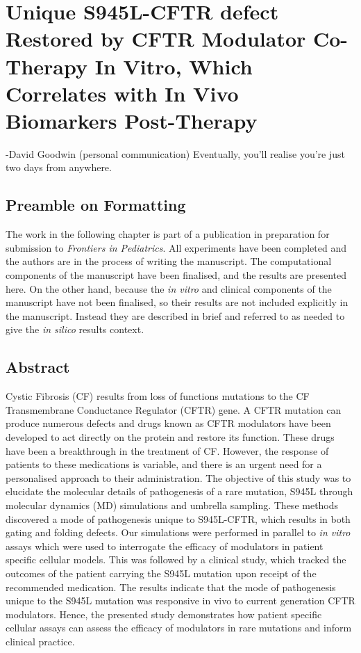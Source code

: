\chapter{Unique S945L-CFTR defect Restored by CFTR Modulator Co-Therapy In Vitro, Which Correlates with In Vivo Biomarkers Post-Therapy}
\label{chap:S945L}

\setcounter{figure}{0}
\renewcommand{\thefigure}{\arabic{chapter}.\arabic{figure}}

\begin{chapquote}{-David Goodwin (personal communication)}
Eventually, you'll realise you're just two days from anywhere.
\end{chapquote}


\section*{\centering Preamble on Formatting} 
The work in the following chapter is part of a publication in preparation for submission to \textit{Frontiers in Pediatrics}. All experiments have been completed and the authors are in the process of writing the manuscript. The computational components of the manuscript have been finalised, and the results are presented here. On the other hand, because the \textit{in vitro} and clinical components of the manuscript have not been finalised, so their results are not included explicitly in the manuscript. Instead they are described in brief and referred to as needed to give the \textit{in silico} results context.

\section*{\centering Abstract} 

Cystic Fibrosis (CF) results from loss of functions mutations to the CF Transmembrane Conductance Regulator (CFTR) gene. A CFTR mutation can produce numerous defects and drugs known as CFTR modulators have been developed to act directly on the protein and restore its function. These drugs have been a breakthrough in the treatment of CF. However, the response of patients to these medications is variable, and there is an urgent need for a personalised approach to their administration. The objective of this study was to elucidate the molecular details of pathogenesis of a rare mutation, S945L through molecular dynamics (MD) simulations and umbrella sampling. These methods discovered a mode of pathogenesis unique to S945L-CFTR, which results in both gating and folding defects. Our simulations were performed in parallel to \textit{in vitro} assays which were used to interrogate the efficacy of modulators in patient specific cellular models. This was followed by a clinical study, which tracked the outcomes of the patient carrying the S945L mutation upon receipt of the recommended medication. The results indicate that the mode of pathogenesis unique to the S945L mutation was responsive in vivo to current generation CFTR modulators. Hence, the presented study demonstrates how patient specific cellular assays can assess the efficacy of modulators in rare mutations and inform clinical practice.


